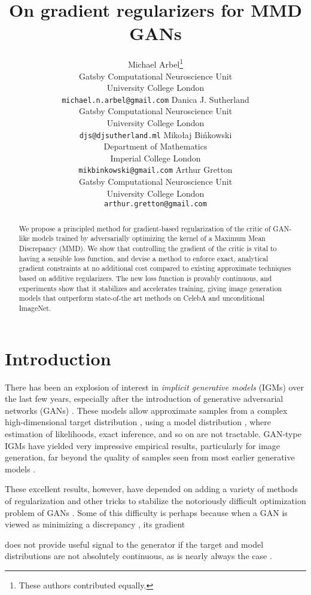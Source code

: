 \documentclass{article}
\title{On gradient regularizers for MMD GANs}
\author{
  Michael Arbel\thanks{These authors contributed equally.\vspace*{-5mm}}\\
  Gatsby Computational Neuroscience Unit\\University College London\\
  \texttt{michael.n.arbel@gmail.com}
  \And
  Danica J. Sutherland\footnotemark[1]\\
  Gatsby Computational Neuroscience Unit\\University College London\\
  \texttt{djs@djsutherland.ml}
  \And
  Miko{\l}aj Bi\'nkowski\\
  \phantom{xxxxx}Department of Mathematics\phantom{xxxxx}\\Imperial College London\\
  \texttt{mikbinkowski@gmail.com}
  \vspace*{-5mm}
  \And
  Arthur Gretton\\
  Gatsby Computational Neuroscience Unit\\University College London\\
  \texttt{arthur.gretton@gmail.com}
  \vspace*{-5mm}
}
\begin{document}
\maketitle

\begin{abstract}
We propose a principled method for gradient-based regularization of the critic of GAN-like models trained by adversarially optimizing the kernel of a Maximum Mean Discrepancy (MMD).
We show that controlling the gradient of the critic is vital to having a sensible loss function,
and devise a method to enforce exact, analytical gradient constraints
at no additional cost compared to existing approximate techniques based on additive regularizers.
The new loss function is provably continuous,
and experiments show that it stabilizes and accelerates training,
giving image generation models that outperform state-of-the art methods
on  CelebA and  unconditional ImageNet.
\end{abstract}

\section{Introduction}



There has been an explosion of interest in \emph{implicit generative models} (IGMs) over the last few years,
especially after the introduction of generative adversarial networks (GANs) \parencite{gans}.
These models allow approximate samples from a complex high-dimensional target distribution ,
using a model distribution , where estimation of likelihoods, exact inference, and so on are not tractable.
GAN-type IGMs have yielded very impressive empirical results,
particularly for image generation,
far beyond the quality of samples seen from most earlier generative models \parencite[e.g.][]{progressive-growing,dcgan,wgan-gp,munit,anime-gans}.

These excellent results, however, have depended on adding a variety of methods of regularization and other tricks to stabilize the notoriously difficult optimization problem of GANs \parencite{improved-gans,dcgan}.
Some of this difficulty is perhaps because
when a GAN is viewed as minimizing a discrepancy ,
its gradient

does not provide useful signal to the generator
if the target and model distributions are not absolutely continuous,
as is nearly always the case \parencite{towards-principled-gans}.
\end{document}
